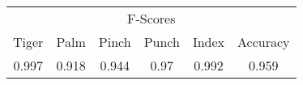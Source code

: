 \documentclass{standalone}
\begin{document}
 
 \begin{tabular}{|c|c|c|c|c ||c|}
\cline{1-6}\multicolumn{6}{|c|}{F-Scores} \\ 
\cline{1-6}Tiger & Palm & Pinch & Punch & Index & Accuracy\\ 
\cline{1-6}0.997 & 0.918 & 0.944 & 0.97 & 0.992 & 0.959\\ 
 \cline{1-6}\hline \end{tabular}
 
\end{document}
